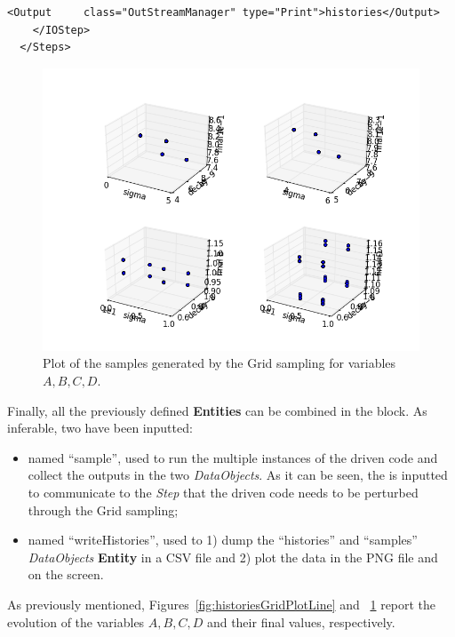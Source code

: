 \begin{enumerate}
\begin{lstlisting}[style=XML,morekeywords={arg,extension,pauseAtEnd,overwrite}]
        <Output 	class="OutStreamManager" type="Print">histories</Output>
    </IOStep>
  </Steps>
\end{lstlisting}
 \begin{figure}[h!]
  \centering
  \includegraphics[scale=0.7]{pics/Grid_pointsets.png}
  \caption{Plot of the samples generated by the Grid sampling for variables $A,B,C,D$.}
  \label{fig:samplesGridPlotLine}
 \end{figure}
   Finally, all the previously defined \textbf{Entities} can be combined in 
   the  block. As inferable, 
   two  have been inputted:
   \begin{itemize}
     \item {} named ``sample'', used to run the multiple  
     instances of the driven code and 
     collect the outputs in the two \textit{DataObjects}. As it can be
     seen, the  is inputted to communicate to the 
     \textit{Step} that the driven code needs to
     be perturbed through the Grid sampling;
     \item  {} named ``writeHistories'', used to 1) dump 
     the ``histories'' and ``samples'' \textit{DataObjects} 
     \textbf{Entity} in a CSV file and 2) plot the data in the PNG file and 
     on the screen.
   \end{itemize}
\end{enumerate} 
 As previously mentioned, Figures~\ref{fig:historiesGridPlotLine} and ~\ref{fig:samplesGridPlotLine}  report the evolution of the 
 variables $A,B,C,D$ and their final values, respectively.

